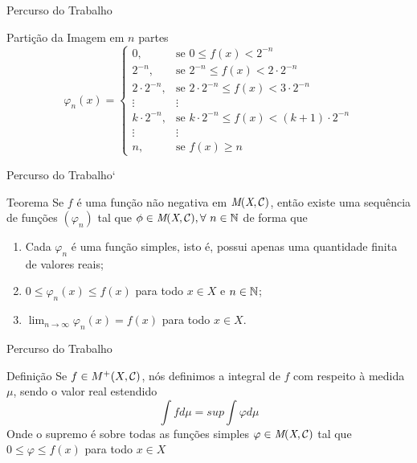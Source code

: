 	\begin{frame}{Percurso do Trabalho}
		\begin{block}{Partição da Imagem em $n$ partes}
			$$
			\varphi_n(x) =\left\{
			\begin{array}{ll}
				0, & \textrm{se\ } 0 \leq f(x) < 2^{-n} \\
				2^{-n}, & \textrm{se\ } 2^{-n} \leq f(x) < 2\cdot2^{-n} \\
				2\cdot2^{-n}, & \textrm{se\ } 2\cdot2^{-n} \leq f(x) < 3\cdot2^{-n} \\
				\vdots & \vdots \\
				k\cdot2^{-n}, & \textrm{se\ } k\cdot2^{-n} \leq f(x) < (k+1)\cdot2^{-n} \\
				\vdots & \vdots \\
				n, & \textrm{se\ } f(x) \geq n
			\end{array}
			\right.
			$$
		\end{block}
	\end{frame}
	\begin{frame}{Percurso do Trabalho`}
		\begin{block}{Teorema}
			Se $f$ é uma função não negativa em $\operatorname{\textit{M}(\textit{X}, \mathcal{C} )}$, então existe uma sequência de funções $(\varphi_n)$ tal que $\phi \in \operatorname{\textit{M}(\textit{X}, \mathcal{C} )}, \forall \ n \in \operatorname{\mathbb{N}}$ de forma que
			\begin{enumerate}
				\item Cada $\varphi_n$ é uma função simples, isto é, possui apenas uma quantidade finita de valores reais;
				\item $0 \leq \varphi_n(x) \leq f(x)$ para todo $x \in X$ e $n \in \operatorname{\mathbb{N}}$;
				\item $\displaystyle\lim_{n \to \infty} \varphi_n(x) = f(x)$ para todo $x \in X$.
			\end{enumerate}
		\end{block}
	\end{frame}
	
	\begin{frame}{Percurso do Trabalho}
		\begin{block}{Definição}
			\justify Se $f \in M^+(X,\operatorname{\mathcal{C}})$, nós definimos a integral de $f$ com respeito à medida $\mu$, sendo o valor real estendido
			$$
			\int f d\mu = sup \int \varphi d\mu
			$$
			Onde o supremo é sobre todas as funções simples $\varphi \in \operatorname{\textit{M}(\textit{X}, \mathcal{C} )}$ tal que  $0 \leq \varphi \leq f(x)$ para todo $x \in X$
		\end{block}
	\end{frame}
	

